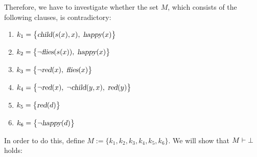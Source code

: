 Therefore, we have to investigate whether the set $M$, which consists of the following clauses, is contradictory:
\begin{enumerate}
\item $k_1 = \bigl\{ \textsl{child}(s(x),x),\; \textsl{happy}(x) \bigl\}$  
\item $k_2 = \bigl\{ \neg \textsl{flies}(s(x)),\; \textsl{happy}(x) \bigl\}$
\item $k_3 = \bigl\{ \neg \textsl{red}(x),\; \textsl{flies}(x) \bigl\}$
\item $k_4 = \bigl\{ \neg \textsl{red}(x),\; \neg \textsl{child}(y,x),\; \textsl{red}(y) \bigl\}$
\item $k_5 = \bigl\{ \textsl{red}(d) \bigl\}$ 
\item $k_6 = \bigl\{ \neg \textsl{happy}(d) \bigl\}$
\end{enumerate}
In order to do this, define $M := \bigl\{k_1,k_2,k_3,k_4,k_5,k_6\bigl\}$.
We will show that $M \vdash \bot$ holds:
